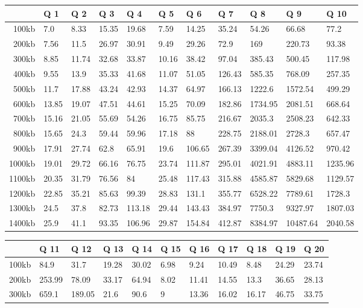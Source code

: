 
\begin {table}[htpb]
\centering
\hspace*{-1.5cm}\begin{tabular}{r|l|l|l|l|l|l|l|l|l|l}
&Q 1&Q 2&Q 3&Q 4&Q 5&Q 6&Q 7&Q 8&Q 9&Q 10\\
\hline
100kb&7.0&8.33&15.35&19.68&7.59&14.25&35.24&54.26&66.68&77.2\\
200kb&7.56&11.5&26.97&30.91&9.49&29.26&72.9&169&220.73&93.38\\
300kb&8.85&11.74&32.68&33.87&10.16&38.42&97.04&385.43&500.45&117.98\\
400kb&9.55&13.9&35.33&41.68&11.07&51.05&126.43&585.35&768.09&257.35\\
500kb&11.7&17.88&43.24&42.93&14.37&64.97&166.13&1222.6&1572.54&499.29\\
600kb&13.85&19.07&47.51&44.61&15.25&70.09&182.86&1734.95&2081.51&668.64\\
700kb&15.16&21.05&55.69&54.26&16.75&85.75&216.67&2035.3&2508.23&642.33\\
800kb&15.65&24.3&59.44&59.96&17.18&88&228.75&2188.01&2728.3&657.47\\
900kb&17.91&27.74&62.8&65.91&19.6&106.65&267.39&3399.04&4126.52&970.42\\
1000kb&19.01&29.72&66.16&76.75&23.74&111.87&295.01&4021.91&4883.11&1235.96\\
1100kb&20.35&31.79&76.56&84&25.48&117.43&315.88&4585.87&5829.68&1129.57\\
1200kb&22.85&35.21&85.63&99.39&28.83&131.1&355.77&6528.22&7789.61&1728.3\\
1300kb&24.5&37.8&82.73&113.18&29.44&143.43&384.97&7750.3&9327.97&1807.03\\
1400kb&25.9&41.1&93.35&106.96&29.87&154.84&412.87&8384.97&10487.64&2040.58\\
\end{tabular}
\newline
\vspace*{0.5 cm}
\newline
\hspace*{-1.5cm}\begin{tabular}{r|l|l|l|l|l|l|l|l|l|l}
&Q 11&Q 12&Q 13&Q 14&Q 15&Q 16&Q 17&Q 18&Q 19&Q 20\\
\hline
100kb&84.9&31.7&19.28&30.02&6.98&9.24&10.49&8.48&24.29&23.74\\
200kb&253.99&78.09&33.17&64.94&8.02&11.41&14.55&13.3&36.65&28.13\\
300kb&659.1&189.05&21.6&90.6&9&13.36&16.02&16.17&46.75&33.75\\

\end{tabular}
\end{table}
